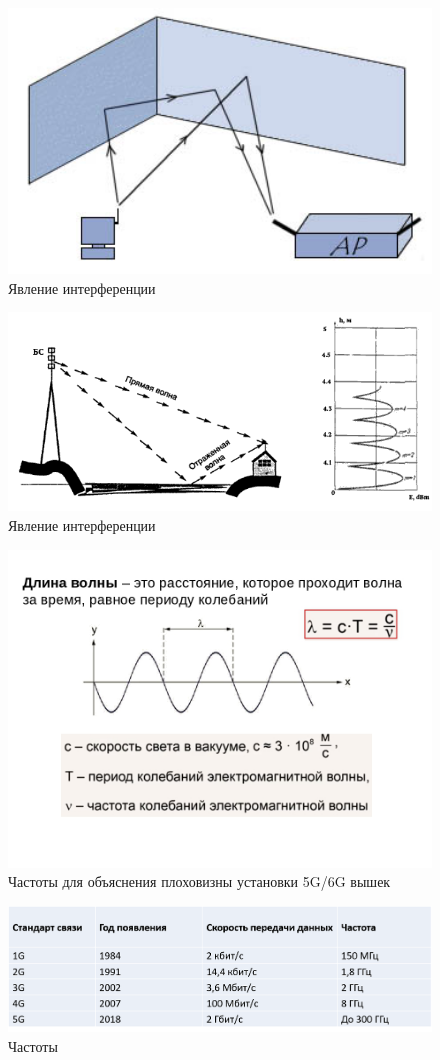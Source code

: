 \documentclass[a4paper,12pt]{article} %
\begin{document}
\begin{figure}
\centering
\includegraphics[width=12cm]{4. interferention}
\caption{Явление интерференции}
\end{figure}

\begin{figure}
\centering
\includegraphics[width=12cm]{5. interference}
\caption{Явление интерференции}
\end{figure}

\begin{figure}
\centering
\includegraphics[width=12cm]{6. 5g6g}
\caption{Частоты для объяснения плоховизны установки 5G/6G вышек}
\end{figure}

\begin{figure}
\centering
\includegraphics[width=16cm]{7. freqG}
\caption{Частоты}
\end{figure}
\end{document}
